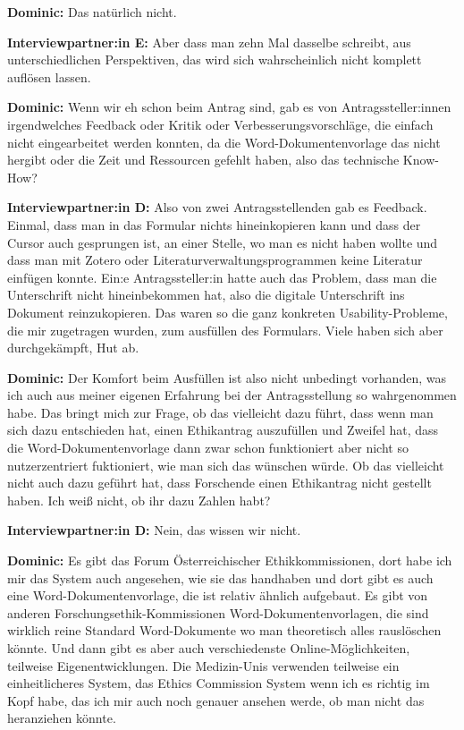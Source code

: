 \documentclass[a4paper,12pt,twoside]{scrreprt}
\begin{document}
\textbf{Dominic:} Das natürlich nicht.

\textbf{Interviewpartner:in E:} Aber dass man zehn Mal dasselbe schreibt, aus unterschiedlichen Perspektiven, das wird sich wahrscheinlich nicht komplett auflösen lassen.

\textbf{Dominic:} Wenn wir eh schon beim Antrag sind, gab es von Antragssteller:innen irgendwelches Feedback oder Kritik oder Verbesserungsvorschläge, die einfach nicht eingearbeitet werden konnten, da die Word-Dokumentenvorlage das nicht hergibt oder die Zeit und Ressourcen gefehlt haben, also das technische Know-How?

\textbf{Interviewpartner:in D:} Also von zwei Antragsstellenden gab es Feedback. Einmal, dass man in das Formular nichts hineinkopieren kann und dass der Cursor auch gesprungen ist, an einer Stelle, wo man es nicht haben wollte und dass man mit Zotero oder Literaturverwaltungsprogrammen keine Literatur einfügen konnte. Ein:e Antragssteller:in hatte auch das Problem, dass man die Unterschrift nicht hineinbekommen hat, also die digitale Unterschrift ins Dokument reinzukopieren. Das waren so die ganz konkreten Usability-Probleme, die mir zugetragen wurden, zum ausfüllen des Formulars. Viele haben sich aber durchgekämpft, Hut ab.

\textbf{Dominic:} Der Komfort beim Ausfüllen ist also nicht unbedingt vorhanden, was ich auch aus meiner eigenen Erfahrung bei der Antragsstellung so wahrgenommen habe. Das bringt mich zur Frage, ob das vielleicht dazu führt, dass wenn man sich dazu entschieden hat, einen Ethikantrag auszufüllen und Zweifel hat, dass die Word-Dokumentenvorlage dann zwar schon funktioniert aber nicht so nutzerzentriert fuktioniert, wie man sich das wünschen würde. Ob das vielleicht nicht auch dazu geführt hat, dass Forschende einen Ethikantrag nicht gestellt haben. Ich weiß nicht, ob ihr dazu Zahlen habt?

\textbf{Interviewpartner:in D:} Nein, das wissen wir nicht.

\textbf{Dominic:} Es gibt das Forum Österreichischer Ethikkommissionen, dort habe ich mir das System auch angesehen, wie sie das handhaben und dort gibt es auch eine Word-Dokumentenvorlage, die ist relativ ähnlich aufgebaut. Es gibt von anderen Forschungsethik-Kommissionen Word-Dokumentenvorlagen, die sind wirklich reine Standard Word-Dokumente wo man theoretisch alles rauslöschen könnte. Und dann gibt es aber auch verschiedenste Online-Möglichkeiten, teilweise Eigenentwicklungen. Die Medizin-Unis verwenden teilweise ein einheitlicheres System, das Ethics Commission System wenn ich es richtig im Kopf habe, das ich mir auch noch genauer ansehen werde, ob man nicht das heranziehen könnte.
\end{document}
